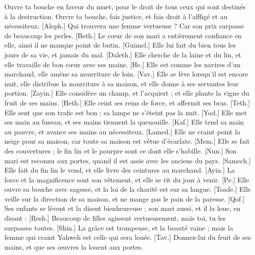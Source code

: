 \begin{multicols}{2}
Ouvre ta bouche en faveur du muet, pour le droit de tous ceux qui sont destinés à la destruction.
Ouvre ta bouche, fais justice, et fais droit à l'affligé et au nécessiteux. 
[Aleph.] Qui trouvera une femme vertueuse ? Car son prix surpasse de beaucoup les perles.
[Beth.] Le cœur de son mari a entièrement confiance en elle, ainsi il ne manque point de butin.
[Guimel.] Elle lui fait du bien tous les jours de sa vie, et jamais du mal.
[Daleth.] Elle cherche de la laine et du lin, et elle travaille de bon cœur avec ses mains.
[He.] Elle est comme les navires d'un marchand, elle amène sa nourriture de loin.
[Vav.] Elle se lève lorsqu'il est encore nuit, elle distribue la nourriture à sa maison, et elle donne à ses servantes leur portion.
[Zayin.] Elle considère un champ, et l'acquiert ; et elle plante la vigne du fruit de ses mains.
[Heth.] Elle ceint ses reins de force, et affermit ses bras.
[Teth.] Elle sent que son trafic est bon ; sa lampe ne s'éteint pas la nuit.
[Yod.] Elle met ses main au fuseau, et ses mains tiennent la quenouille.
[Kaf.] Elle tend sa main au pauvre, et avance ses mains au nécessiteux.
[Lamed.] Elle ne craint point la neige pour sa maison, car toute sa maison est vêtue d'écarlate.
[Mem.] Elle se fait des couvertures ; le fin lin et le pourpre sont ce dont elle s'habille.
[Nun.] Son mari est reconnu aux portes, quand il est assis avec les anciens du pays.
[Samech.] Elle fait du fin lin le vend, et elle livre des ceintures au marchand.
[Ayin.] La force et la magnificence sont son vêtement, et elle se rit du jour à venir.
[Pe.] Elle ouvre sa bouche avec sagesse, et la loi de la charité est sur sa langue.
[Tsade.] Elle veille sur la direction de sa maison, et ne mange pas le pain de la paresse.
[Qof.] Ses enfants se lèvent et la disent bienheureuse ; son mari aussi, et il la loue, en disant :
[Resh.] Beaucoup de filles agissent vertueusement, mais toi, tu les surpasses toutes.
[Shin.] La grâce est trompeuse, et la beauté vaine ; mais la femme qui craint Yahweh est celle qui sera louée.
[Tav.] Donnez-lui du fruit de ses mains, et que ses œuvres la louent aux portes.
\PPE{}
\end{multicols}
